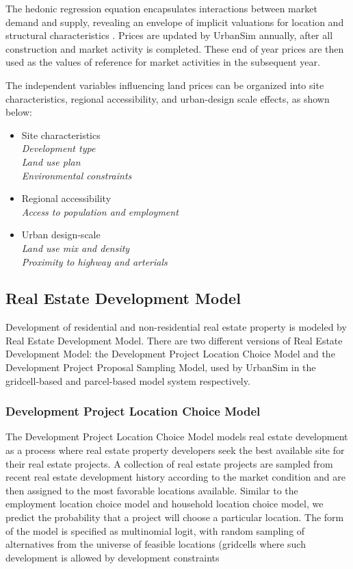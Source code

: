 The hedonic regression equation encapsulates interactions between
market demand and supply, revealing an envelope of implicit
valuations for location and structural characteristics \cite{dipasquale-wheaton-1996}.
Prices are updated by UrbanSim annually, after all construction and market
activity is completed.  These end of year prices are then used as
the values of reference for market activities in the subsequent
year.

The independent variables influencing land prices can be organized
into site characteristics, regional accessibility, and urban-design
scale effects, as shown below:

\begin{itemize}

\item Site characteristics \\
\emph{Development type \\
Land use plan \\
Environmental constraints}

\item Regional accessibility \\
\emph{Access to population and employment}

\item Urban design-scale \\
\emph{Land use mix and density \\
Proximity to highway and arterials}

\end{itemize}

\subsection{Real Estate Development Model}
\label{real-estate-development-model}


Development of residential and non-residential real estate
property is modeled by Real Estate Development Model.  There
are two different versions of Real Estate Development Model:
the Development Project Location Choice Model and the
Development Project Proposal Sampling Model, used by
UrbanSim in the gridcell-based and parcel-based model system
respectively.

\subsubsection{Development Project Location Choice Model}
The Development Project Location Choice Model models real
estate development as a process where real estate property
developers seek the best available site for their real
estate projects.  A collection of real estate projects are
sampled from recent real estate development history
according to the market condition and are then assigned to
the most favorable locations available.  Similar to the
employment location choice model and household location
choice model, we predict the probability that a project will
choose a particular location.  The form of the
model is specified as multinomial logit, with random
sampling of alternatives from the universe of feasible
locations (gridcells where such development is allowed by
development constraints

